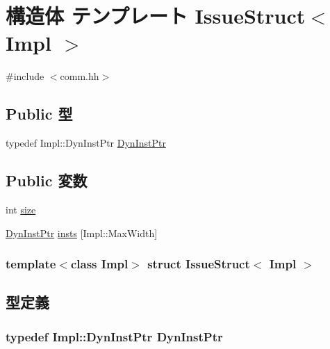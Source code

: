 \hypertarget{structIssueStruct}{
\section{構造体 テンプレート IssueStruct$<$ Impl $>$}
\label{structIssueStruct}
}


{\ttfamily \#include $<$comm.hh$>$}\subsection*{Public 型}
\begin{DoxyCompactItemize}
\item 
typedef Impl::DynInstPtr \hyperlink{structIssueStruct_a028ce10889c5f6450239d9e9a7347976}{DynInstPtr}
\end{DoxyCompactItemize}
\subsection*{Public 変数}
\begin{DoxyCompactItemize}
\item 
int \hyperlink{structIssueStruct_a439227feff9d7f55384e8780cfc2eb82}{size}
\item 
\hyperlink{structIssueStruct_a028ce10889c5f6450239d9e9a7347976}{DynInstPtr} \hyperlink{structIssueStruct_a84958be72c3a0ec66109a9483e6c0331}{insts} \mbox{[}Impl::MaxWidth\mbox{]}
\end{DoxyCompactItemize}
\subsubsection*{template$<$class Impl$>$ struct IssueStruct$<$ Impl $>$}



\subsection{型定義}
\hypertarget{structIssueStruct_a028ce10889c5f6450239d9e9a7347976}{
\subsubsection[{DynInstPtr}]{\setlength{\rightskip}{0pt plus 5cm}typedef Impl::DynInstPtr {\bf DynInstPtr}}}
\label{structIssueStruct_a028ce10889c5f6450239d9e9a7347976}



